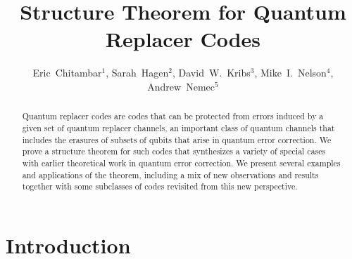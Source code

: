 \documentclass[11pt]{amsart}
\theoremstyle{definition}
\theoremstyle{definition}
\theoremstyle{definition}
\newcommand{\1}{\mathbb{I}}
\begin{document}
\title[Structure Theorem for Quantum Replacer Codes]{Structure Theorem for Quantum Replacer Codes}
\author[E.~Chitambar, S.~Hagen, D.W.~Kribs, M.I.~Nelson, A.~Nemec]{Eric~Chitambar$^1$, Sarah~Hagen$^2$, David~W.~Kribs$^3$, Mike~I.~Nelson$^4$, Andrew~Nemec$^5$}

\address{$^1$Department of Electrical and Computer Engineering, University of Illinois at Urbana Champaign, 901 West Illinois Street, Urbana, IL 61801 USA}
\address{$^2$Department of Physics, University of Illinois at Urbana Champaign, 1110 West Green Street, Urbana, IL 61801 USA}
\address{$^3$Department of Mathematics \& Statistics, University of Guelph, 50 Stone Road East, Guelph, ON Canada N1G 2W1}
\address{$^4$Materials Research Laboratory at The Grainger College of Engineering, University of Illinois at Urbana Champaign, 901 West Illinois Street, Urbana, IL 61801 USA}
\address{$^5$Department of Computer Science, University of Texas at Dallas, 890 Franklyn Jenifer Drive, Richardson, TX 75080 USA}


\begin{abstract}
Quantum replacer codes are codes that can be protected from errors induced by a given set of quantum replacer channels, an important class of quantum channels that includes the erasures of subsets of qubits that arise in quantum error correction. We prove a structure theorem for such codes that synthesizes a variety of special cases with earlier theoretical work in quantum error correction. We present several examples and applications of the theorem, including a mix of new observations and results together with some subclasses of codes revisited from this new perspective.   
\end{abstract}






\maketitle


\section{Introduction}
\end{document}
